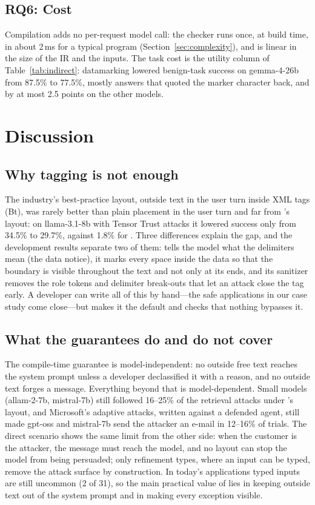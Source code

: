 \documentclass[journal]{IEEEtran}
\begin{document}
\subsection{RQ6: Cost}
Compilation adds no per-request model call: the checker runs once, at build time, in about 2\,ms for a typical program (Section~\ref{sec:complexity}), and  is linear in the size of the IR and the inputs. The task cost is the utility column of Table~\ref{tab:indirect}: datamarking lowered benign-task success on gemma-4-26b from 87.5\% to 77.5\%, mostly answers that quoted the marker character back, and by at most 2.5 points on the other models.

\section{Discussion}\label{sec:discussion}

\subsection{Why tagging is not enough}
The industry's best-practice layout, outside text in the user turn inside XML tags (Bt), was rarely better than plain placement in the user turn and far from \TL{}'s layout: on llama-3.1-8b with Tensor Trust attacks it lowered success only from 34.5\% to 29.7\%, against 1.8\% for \TL{}. Three differences explain the gap, and the development results separate two of them: \TL{} tells the model what the delimiters mean (the data notice), it marks every space inside the data so that the boundary is visible throughout the text and not only at its ends, and its sanitizer removes the role tokens and delimiter break-outs that let an attack close the tag early. A developer can write all of this by hand---the safe applications in our case study come close---but \TL{} makes it the default and checks that nothing bypasses it.

\subsection{What the guarantees do and do not cover}
The compile-time guarantee is model-independent: no outside free text reaches the system prompt unless a developer declassified it with a reason, and no outside text forges a message. Everything beyond that is model-dependent. Small models (allam-2-7b, mistral-7b) still followed 16--25\% of the retrieval attacks under \TL{}'s layout, and Microsoft's adaptive attacks, written against a defended agent, still made gpt-oss and mistral-7b send the attacker an e-mail in 12--16\% of trials. The direct scenario shows the same limit from the other side: when the customer is the attacker, the message must reach the model, and no layout can stop the model from being persuaded; only refinement types, where an input can be typed, remove the attack surface by construction. In today's applications typed inputs are still uncommon (2 of 31), so the main practical value of \TL{} lies in keeping outside text out of the system prompt and in making every exception visible.
\end{document}
